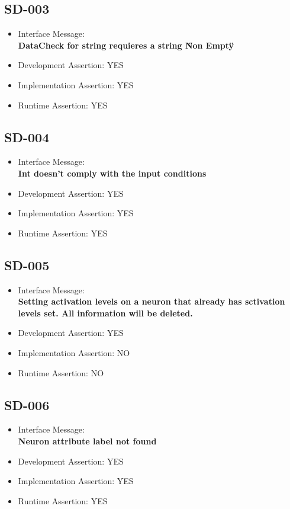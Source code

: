 \subsection{SD-003}
\begin{itemize}
  \item Interface Message:\\[1em]
    \textbf{DataCheck for string requieres a string \"Non Empty\"}
  \item Development Assertion: YES
  \item Implementation Assertion: YES
  \item Runtime Assertion: YES
\end{itemize}

\subsection{SD-004}
\begin{itemize}
  \item Interface Message:\\[1em]
    \textbf{Int doesn't comply with the input conditions}
  \item Development Assertion: YES
  \item Implementation Assertion: YES
  \item Runtime Assertion: YES
\end{itemize}

\subsection{SD-005}
\begin{itemize}
  \item Interface Message:\\[1em]
    \textbf{Setting activation levels on a neuron that already has sctivation levels set. All information will be deleted.}
  \item Development Assertion: YES
  \item Implementation Assertion: NO
  \item Runtime Assertion: NO
\end{itemize}

\subsection{SD-006}
\begin{itemize}
  \item Interface Message:\\[1em]
    \textbf{Neuron attribute label not found}
  \item Development Assertion: YES
  \item Implementation Assertion: YES
  \item Runtime Assertion: YES
\end{itemize}

